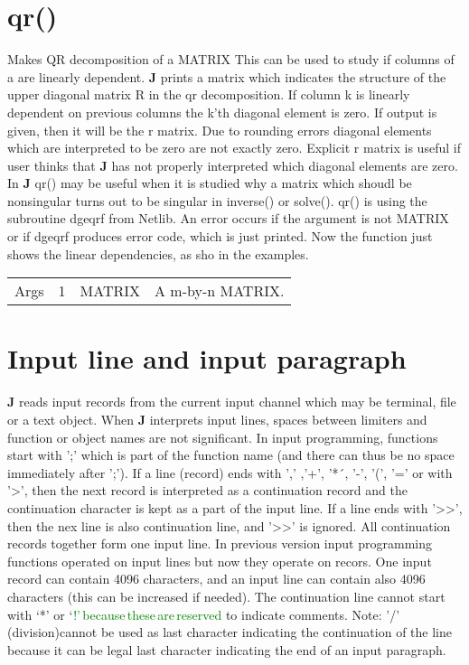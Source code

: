 \section{qr()}
\label{qr}
 Makes QR decomposition of a MATRIX This can be used to study if columns of a are linearly
 dependent. \textbf{J} prints a matrix which indicates the structure of the upper diagonal matrix R in the
 qr decomposition. If column k is linearly dependent on previous columns the k’th diagonal
 element is zero. If output is given, then it will be the r matrix. Due to rounding errors diagonal
 elements which are interpreted to be zero are not exactly zero. Explicit r matrix is useful if user
 thinks that \textbf{J} has not properly interpreted which diagonal elements are zero.
In \textbf{J}  \textcolor{VioletRed}{qr}() may be useful when it is studied why a matrix which shoudl
 be nonsingular turns out to be singular in \textcolor{VioletRed}{inverse}() or \textcolor{VioletRed}{solve}().
\textcolor{VioletRed}{qr}() is using  the subroutine dgeqrf from Netlib.
An error occurs if the argument is not MATRIX or if dgeqrf produces
 error code, which is just printed.
Now the function just shows the linear dependencies, as sho in the examples.
\begin{table}[H]
\begin{tabular}{ m{}  m{}m{}p{}}
Args&1&MATRIX&A m-by-n MATRIX.
\\ \cline{1-4}
\end{tabular}
\end{table}
\section{Input line and input paragraph}
\label{inpuline}
\textbf{J} reads input records from the current input channel which may be terminal, file or a text object.
 When \textbf{J} interprets input lines, spaces between limiters and function or object names are not
 significant. In input programming, functions start with ';' which is part of the function name (and
 there can thus be no space immediately after ';'). If a line (record) ends with ',' ,'+', '*´, '-',
 '(', '=' or with '>', then the next record is interpreted as a continuation record and
 the continuation character is kept as a part of the input
 line. If a line ends with '>>', then
 the nex line is also continuation line, and  '>>' is ignored. All continuation
 records together form one input line. In previous version input programming functions operated on input lines
 but now they operate on recors. One input record can contain 4096 characters, and an input line can contain also 4096 characters
 (this can be increased if needed).
 The continuation line cannot start with ‘*’ or ‘\textcolor{green}{!’\,because\,these\,are\,reserved}
 to indicate comments.  Note: '/' (division)cannot be used as last character indicating the continuation of the line because it can
 be legal last character indicating the end of an input paragraph.

